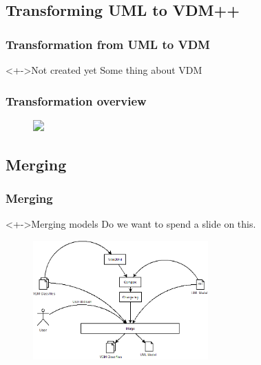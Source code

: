 \subsection{Transforming UML to VDM++}
%
%
\frame
{
  \frametitle{Transformation from UML to VDM}

\begin{center}
	\begin{block}<+->{Not created yet}
	Some thing about VDM
	\end{block}

\end{center}
}



%
%
\frame
{
  \frametitle{Transformation overview}
\begin{center}
\begin{figure}

\includegraphics<1->[width=\textwidth]{images/OverviewOverMapping.png}%
%
%
%
%
%

\end{figure}
\end{center}
}

\subsection{Merging}
%
%
\frame
{
  \frametitle{Merging}

\begin{center}
	\begin{block}<+->{Merging models}
	Do we want to spend a slide on this.
	\end{block}

\begin{figure}
\includegraphics[width=0.6\textwidth]{images/Merge.png}
\end{figure}

\end{center}
}



